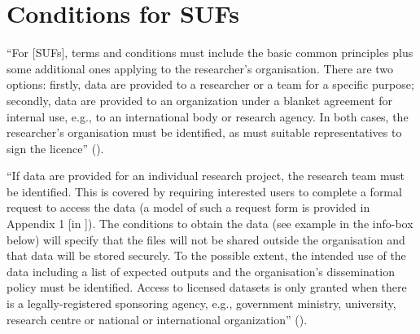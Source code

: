 \documentclass[letterpaper,10pt,english]{sphinxmanual}
\begin{document}
\section{Conditions for SUFs}
\label{\detokenize{release_types:conditions-for-sufs}}
“For {[}SUFs{]}, terms and conditions must include the basic common
principles plus some additional ones applying to the researcher’s
organisation. There are two options: firstly, data are provided to a
researcher or a team for a specific purpose; secondly, data are provided
to an organization under a blanket agreement for internal use, e.g., to
an international body or research agency. In both cases, the
researcher’s organisation must be identified, as must suitable
representatives to sign the licence” ({\hyperref[\detokenize{release_types:dubo10}]{}}).


“If data are provided for an individual research project, the research
team must be identified. This is covered by requiring interested users
to complete a formal request to access the data (a model of such a
request form is provided in Appendix 1 {[}in {\hyperref[\detokenize{release_types:dubo10}]{}}{]}).
The conditions to obtain the data (see example in the info-box below) will specify
that the files will not be shared outside the organisation and that data
will be stored securely. To the possible extent, the intended use of the
data \textendash{} including a list of expected outputs and the organisation’s
dissemination policy \textendash{} must be identified. Access to licensed datasets
is only granted when there is a legally-registered sponsoring agency,
e.g., government ministry, university, research centre or national or
international organization” ({\hyperref[\detokenize{release_types:dubo10}]{}}).
\end{document}
